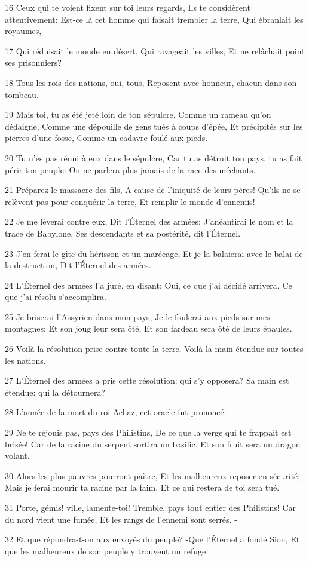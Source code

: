 \par 16 Ceux qui te voient fixent sur toi leurs regards, Ils te considèrent attentivement: Est-ce là cet homme qui faisait trembler la terre, Qui ébranlait les royaumes,
\par 17 Qui réduisait le monde en désert, Qui ravageait les villes, Et ne relâchait point ses prisonniers?
\par 18 Tous les rois des nations, oui, tous, Reposent avec honneur, chacun dans son tombeau.
\par 19 Mais toi, tu as été jeté loin de ton sépulcre, Comme un rameau qu'on dédaigne, Comme une dépouille de gens tués à coups d'épée, Et précipités sur les pierres d'une fosse, Comme un cadavre foulé aux pieds.
\par 20 Tu n'es pas réuni à eux dans le sépulcre, Car tu as détruit ton pays, tu as fait périr ton peuple: On ne parlera plus jamais de la race des méchants.
\par 21 Préparez le massacre des fils, A cause de l'iniquité de leurs pères! Qu'ils ne se relèvent pas pour conquérir la terre, Et remplir le monde d'ennemis! -
\par 22 Je me lèverai contre eux, Dit l'Éternel des armées; J'anéantirai le nom et la trace de Babylone, Ses descendants et sa postérité, dit l'Éternel.
\par 23 J'en ferai le gîte du hérisson et un marécage, Et je la balaierai avec le balai de la destruction, Dit l'Éternel des armées.
\par 24 L'Éternel des armées l'a juré, en disant: Oui, ce que j'ai décidé arrivera, Ce que j'ai résolu s'accomplira.
\par 25 Je briserai l'Assyrien dans mon pays, Je le foulerai aux pieds sur mes montagnes; Et son joug leur sera ôté, Et son fardeau sera ôté de leurs épaules.
\par 26 Voilà la résolution prise contre toute la terre, Voilà la main étendue sur toutes les nations.
\par 27 L'Éternel des armées a pris cette résolution: qui s'y opposera? Sa main est étendue: qui la détournera?
\par 28 L'année de la mort du roi Achaz, cet oracle fut prononcé:
\par 29 Ne te réjouis pas, pays des Philistins, De ce que la verge qui te frappait est brisée! Car de la racine du serpent sortira un basilic, Et son fruit sera un dragon volant.
\par 30 Alors les plus pauvres pourront paître, Et les malheureux reposer en sécurité; Mais je ferai mourir ta racine par la faim, Et ce qui restera de toi sera tué.
\par 31 Porte, gémis! ville, lamente-toi! Tremble, pays tout entier des Philistins! Car du nord vient une fumée, Et les rangs de l'ennemi sont serrés. -
\par 32 Et que répondra-t-on aux envoyés du peuple? -Que l'Éternel a fondé Sion, Et que les malheureux de son peuple y trouvent un refuge.

